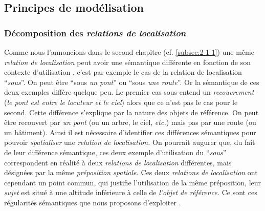 \subsection{Principes de modélisation}

\subsubsection{Décomposition des \emph{relations de localisation}}

Comme nous l’annoncions dans le second chapitre
(cf. \ref{subsec:2-1-1}) une même \emph{relation de localisation} peut
avoir une sémantique différente en fonction de son contexte
d'utilisation \autocite[16]{Borillo1998}, c'est par exemple le cas de
la relation de localisation \enquote{\emph{sous}}. On peut être
\enquote{sous \emph{un pont}} ou \enquote{sous \emph{une route}}. Or
la sémantique de ces deux exemples diffère quelque peu. Le premier cas
sous-entend un \emph{recouvrement} (\ie \emph{le pont est entre le
  locuteur et le ciel}) alors que ce n'est pas le cas pour le
second. Cette différence s'explique par la nature des objets de
référence. On peut être recouvert par \emph{un pont} (ou un arbre, le
ciel, \emph{etc.})  mais pas par une route (ou un bâtiment). Ainsi il
est nécessaire d'identifier ces différences sémantiques pour pouvoir
\emph{spatialiser} une \emph{relation de localisation.}
%
On pourrait augurer que, du fait de leur différence sémantique, ces
deux exemple d'utilisation du \enquote{\emph{sous}} correspondent en
réalité à deux \emph{relations de localisation} différentes, mais
désignées par la même \emph{préposition spatiale.}
%
Ces deux \emph{relations de localisation} ont cependant un point
commun, qui justifie l'utilisation de la même préposition, leur
\emph{sujet} est situé à une altitude inférieure à celle de
\emph{l'objet de référence.} Ce sont ces régularités sémantiques que
nous proposons d'exploiter \autocite{Bunel2019a}.

